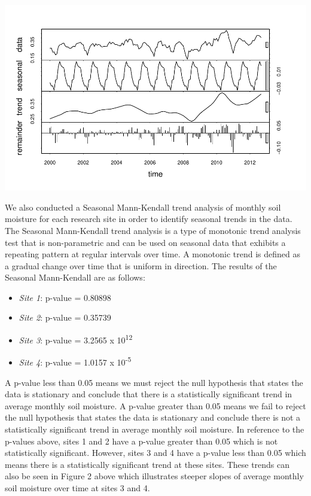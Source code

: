 \documentclass[
  12pt,
]{article}
\providecommand{\tightlist}{%
  \setlength{\itemsep}{0pt}\setlength{\parskip}{0pt}}
\begin{document}
\includegraphics{Project_Template_files/figure-latex/TSA-4.pdf}

We also conducted a Seasonal Mann-Kendall trend analysis of monthly soil
moisture for each research site in order to identify seasonal trends in
the data. The Seasonal Mann-Kendall trend analysis is a type of
monotonic trend analysis test that is non-parametric and can be used on
seasonal data that exhibits a repeating pattern at regular intervals
over time. A monotonic trend is defined as a gradual change over time
that is uniform in direction. The results of the Seasonal Mann-Kendall
are as follows:

\begin{itemize}
\tightlist
\item
  \emph{Site 1}: p-value = 0.80898
\item
  \emph{Site 2}: p-value = 0.35739
\item
  \emph{Site 3}: p-value = 3.2565 x 10\textsuperscript{12}
\item
  \emph{Site 4}: p-value = 1.0157 x 10\textsuperscript{-5}
\end{itemize}

A p-value less than 0.05 means we must reject the null hypothesis that
states the data is stationary and conclude that there is a statistically
significant trend in average monthly soil moisture. A p-value greater
than 0.05 means we fail to reject the null hypothesis that states the
data is stationary and conclude there is not a statistically significant
trend in average monthly soil moisture. In reference to the p-values
above, sites 1 and 2 have a p-value greater than 0.05 which is not
statistically significant. However, sites 3 and 4 have a p-value less
than 0.05 which means there is a statistically significant trend at
these sites. These trends can also be seen in Figure 2 above which
illustrates steeper slopes of average monthly soil moisture over time at
sites 3 and 4.
\end{document}
